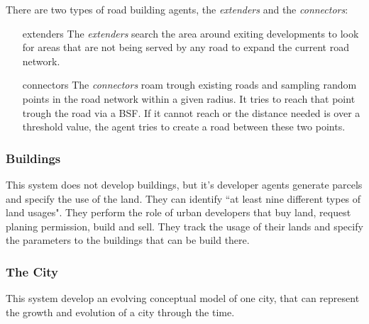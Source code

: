 There are two types of road building agents, the \emph{extenders} and the \emph{connectors}:

\begin{itemize}
	\item[extenders] The \emph{extenders} search the area around exiting developments to look for areas that are not being served by any road to expand the current road network.
	
	\item[connectors] The \emph{connectors} roam trough existing roads and sampling random points in the road network within a given radius. It tries to reach that point trough the road via a BSF. If it cannot reach or the distance needed is over a threshold value, the agent tries to create a road between these two points.
\end{itemize}





\subsubsection{Buildings} %
\label{ssub:buildings}

This system does not develop buildings, but it's developer agents generate parcels and specify the use of the land. They can identify ``at least nine different types of land usages". They perform the role of urban developers that buy land, request planing permission, build and sell. They track the usage of their lands and specify the parameters to the buildings that can be build there.


\subsubsection{The City} %
\label{ssub:the_city}

This system develop an evolving conceptual model of one city, that can represent the growth and evolution of a city through the time. 



